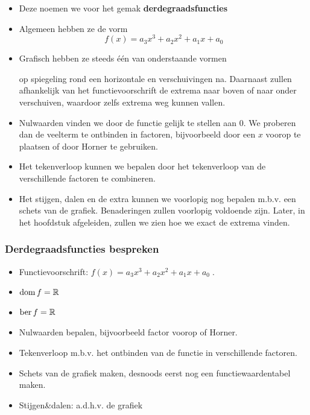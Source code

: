 \documentclass[12pt,twoside,a4paper]{article}
\begin{document}
\begin{itemize}
\item Deze noemen we voor het gemak {\bf derdegraadsfuncties}
\item Algemeen hebben ze de vorm
  \[f(x)=a_3x^3+a_2x^2+a_1x+a_0\]
\item Grafisch hebben ze steeds één van onderstaande vormen
  \begin{center}
  \end{center}
  op spiegeling rond een horizontale en verschuivingen na. Daarnaast zullen afhankelijk van het functievoorschrift de extrema naar boven of naar onder verschuiven, waardoor zelfs extrema weg kunnen vallen.
\item Nulwaarden vinden we door de functie gelijk te stellen aan 0. We proberen dan de veelterm te ontbinden in factoren, bijvoorbeeld door een $x$ voorop te plaatsen of door Horner te gebruiken.
\item Het tekenverloop kunnen we bepalen door het tekenverloop van de verschillende factoren te combineren.
\item Het stijgen, dalen en de extra kunnen we voorlopig nog bepalen m.b.v. een schets van de grafiek. Benaderingen zullen voorlopig voldoende zijn. Later, in het hoofdstuk afgeleiden, zullen we zien hoe we exact de extrema vinden.
\end{itemize}

\subsubsection*{Derdegraadsfuncties bespreken}
\begin{mdframed}
  \begin{itemize}
  \item Functievoorschrift: $f(x)= a_3x^3+a_2x^2+a_1x+a_0\;.$
  \item $\dom f = \mathbb{R}$
  \item $\ber f = \mathbb{R}$
  \item Nulwaarden bepalen, bijvoorbeeld factor voorop of Horner.
  \item Tekenverloop m.b.v. het ontbinden van de functie in verschillende factoren.
  \item Schets van de grafiek maken, desnoods eerst nog een functiewaardentabel maken.
  \item Stijgen\&dalen: a.d.h.v. de grafiek
  \end{itemize}
\end{mdframed}
\end{document}
